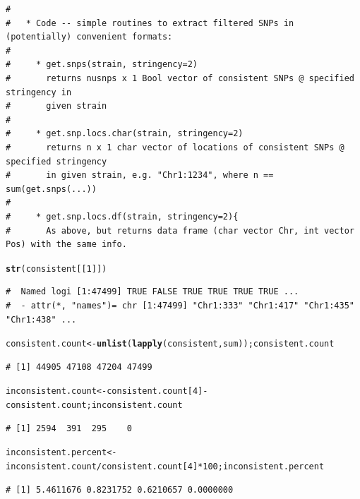 \documentclass{article}\usepackage[]{graphicx}\usepackage[]{color}
\makeatletter
\newcommand{\hlnum}[1]{\textcolor[rgb]{0.686,0.059,0.569}{#1}}%
\newcommand{\hlopt}[1]{\textcolor[rgb]{0,0,0}{#1}}%
\newcommand{\hlstd}[1]{\textcolor[rgb]{0.345,0.345,0.345}{#1}}%
\newcommand{\hlkwb}[1]{\textcolor[rgb]{0.69,0.353,0.396}{#1}}%
\newcommand{\hlkwd}[1]{\textcolor[rgb]{0.737,0.353,0.396}{\textbf{#1}}}%
\newenvironment{kframe}{%
 \def\at@end@of@kframe{}%
 \ifinner\ifhmode%
  \def\at@end@of@kframe{\end{minipage}}%
  \begin{minipage}{\columnwidth}%
 \fi\fi%
 \def\FrameCommand##1{\hskip\@totalleftmargin \hskip-\fboxsep
 \colorbox{shadecolor}{##1}\hskip-\fboxsep
     \hskip-\linewidth \hskip-\@totalleftmargin \hskip\columnwidth}%
 \MakeFramed {\advance\hsize-\width
   \@totalleftmargin\z@ \linewidth\hsize
   \@setminipage}}%
 {\par\unskip\endMakeFramed%
 \at@end@of@kframe}
\newenvironment{knitrout}{}{} %
\makeatother
\begin{document}
\begin{knitrout}
\begin{kframe}
\begin{verbatim}
# 
#   * Code -- simple routines to extract filtered SNPs in (potentially) convenient formats:
# 
#     * get.snps(strain, stringency=2)
#       returns nusnps x 1 Bool vector of consistent SNPs @ specified stringency in
#       given strain
# 
#     * get.snp.locs.char(strain, stringency=2)
#       returns n x 1 char vector of locations of consistent SNPs @ specified stringency
#       in given strain, e.g. "Chr1:1234", where n == sum(get.snps(...))
# 
#     * get.snp.locs.df(strain, stringency=2){
#       As above, but returns data frame (char vector Chr, int vector Pos) with the same info.
\end{verbatim}
\end{kframe}
\end{knitrout}
\begin{knitrout}\tiny
{}\color{fgcolor}\begin{kframe}
\begin{alltt}
\hlkwd{str}\hlstd{(consistent[[}\hlnum{1}\hlstd{]])}
\end{alltt}
\begin{verbatim}
#  Named logi [1:47499] TRUE FALSE TRUE TRUE TRUE TRUE ...
#  - attr(*, "names")= chr [1:47499] "Chr1:333" "Chr1:417" "Chr1:435" "Chr1:438" ...
\end{verbatim}
\end{kframe}
\end{knitrout}
\begin{knitrout}\footnotesize
{}\color{fgcolor}\begin{kframe}
\begin{alltt}
\hlstd{consistent.count} \hlkwb{<-} \hlkwd{unlist}\hlstd{(}\hlkwd{lapply}\hlstd{(consistent, sum)) ; consistent.count}
\end{alltt}
\begin{verbatim}
# [1] 44905 47108 47204 47499
\end{verbatim}
\begin{alltt}
\hlstd{inconsistent.count} \hlkwb{<-} \hlstd{consistent.count[}\hlnum{4}\hlstd{]} \hlopt{-} \hlstd{consistent.count; inconsistent.count}
\end{alltt}
\begin{verbatim}
# [1] 2594  391  295    0
\end{verbatim}
\begin{alltt}
\hlstd{inconsistent.percent} \hlkwb{<-} \hlstd{inconsistent.count}\hlopt{/}\hlstd{consistent.count[}\hlnum{4}\hlstd{]}\hlopt{*}\hlnum{100}\hlstd{; inconsistent.percent}
\end{alltt}
\begin{verbatim}
# [1] 5.4611676 0.8231752 0.6210657 0.0000000
\end{verbatim}
\end{kframe}
\end{knitrout}
\end{document}
